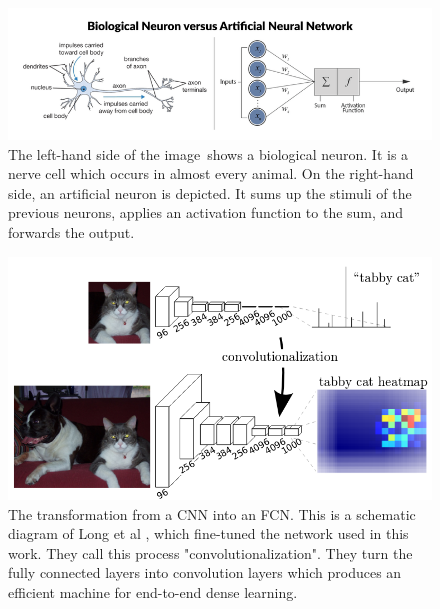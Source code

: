 \begin{figure}[H]
	\centering
	\includegraphics[width=1\linewidth]{Figures/chap1/bio_vs_arti_neuron.png}
	\caption[Caption for LOF]{The left-hand side of the image\footnotemark\ shows a biological neuron. It is a nerve cell which occurs in almost every animal. On the right-hand side, an artificial neuron is depicted. It sums up the stimuli of the previous neurons, applies an activation function to the sum, and forwards the output.}
	\label{fig:test1}
\end{figure}


\begin{figure}[H]
	\centering
	\includegraphics[width=1\linewidth]{Figures/chap1/JLongEtAl.png}
	\caption{The transformation from a CNN into an FCN. This is a schematic diagram of Long et al \cite{jlong}, which fine-tuned the network used in this work. They call this process "convolutionalization". They turn the fully connected layers into convolution layers which produces an efficient machine for end-to-end dense learning. }
	\label{fig:chap1:JLongEtAl}
\end{figure}

